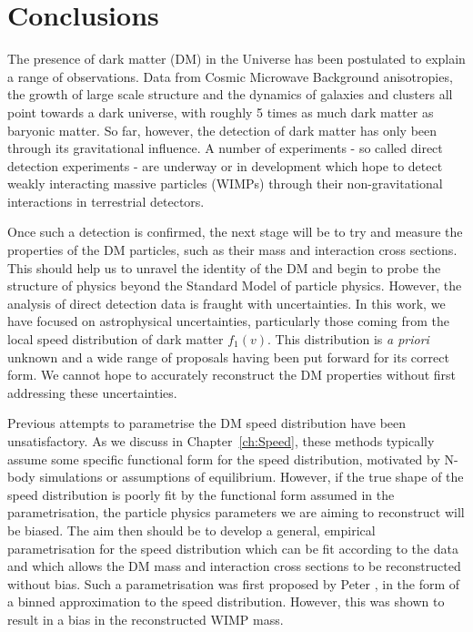 \chapter{Conclusions}
\label{ch:Conclusions}

The presence of dark matter (DM) in the Universe has been postulated to explain a range of observations. Data from Cosmic Microwave Background anisotropies, the growth of large scale structure and the dynamics of galaxies and clusters all point towards a dark universe, with roughly 5 times as much dark matter as baryonic matter. So far, however, the detection of dark matter has only been through its gravitational influence. A number of experiments - so called direct detection experiments - are underway or in development which hope to detect weakly interacting massive particles (WIMPs) through their non-gravitational interactions in terrestrial detectors.

Once such a detection is confirmed, the next stage will be to try and measure the properties of the DM particles, such as their mass and interaction cross sections. This should help us to unravel the identity of the DM and begin to probe the structure of physics beyond the Standard Model of particle physics. However, the analysis of direct detection data is fraught with uncertainties. In this work, we have focused on astrophysical uncertainties, particularly those coming from the local speed distribution of dark matter $f_1(v)$. This distribution is \textit{a priori} unknown and a wide range of proposals having been put forward for its correct form. We cannot hope to accurately reconstruct the DM properties without first addressing these uncertainties.

Previous attempts to parametrise the DM speed distribution have been unsatisfactory. As we discuss in Chapter~\ref{ch:Speed}, these methods typically assume some specific functional form for the speed distribution, motivated by N-body simulations or assumptions of equilibrium. However, if the true shape of the speed distribution is poorly fit by the functional form assumed in the parametrisation, the particle physics parameters we are aiming to reconstruct will be biased. The aim then should be to develop a general, empirical parametrisation for the speed distribution which can be fit according to the data and which allows the DM mass and interaction cross sections to be reconstructed without bias. Such a parametrisation was first proposed by Peter \cite{Peter:2011}, in the form of a binned approximation to the speed distribution. However, this was shown to result in a bias in the reconstructed WIMP mass. 

